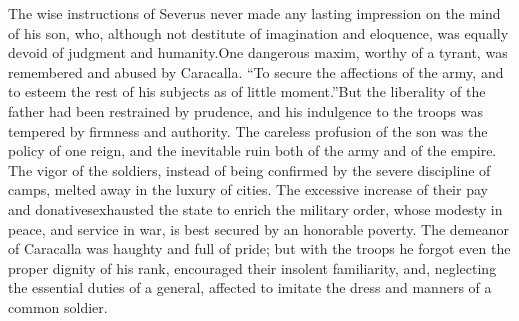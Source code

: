 The wise instructions of Severus never made any lasting
impression on the mind of his son, who, although not destitute of
imagination and eloquence, was equally devoid of judgment and
humanity.\footnotemark[36] One dangerous maxim, worthy of a tyrant, was
remembered and abused by Caracalla. “To secure the affections of
the army, and to esteem the rest of his subjects as of little
moment.”\footnotemark[37] But the liberality of the father had been restrained
by prudence, and his indulgence to the troops was tempered by
firmness and authority. The careless profusion of the son was the
policy of one reign, and the inevitable ruin both of the army and
of the empire. The vigor of the soldiers, instead of being
confirmed by the severe discipline of camps, melted away in the
luxury of cities. The excessive increase of their pay and
donatives\footnotemark[38] exhausted the state to enrich the military order,
whose modesty in peace, and service in war, is best secured by an
honorable poverty. The demeanor of Caracalla was haughty and full
of pride; but with the troops he forgot even the proper dignity
of his rank, encouraged their insolent familiarity, and,
neglecting the essential duties of a general, affected to imitate
the dress and manners of a common soldier.



